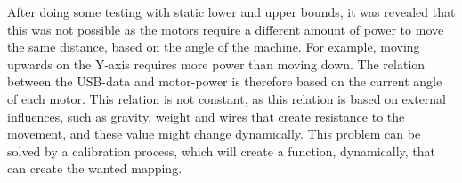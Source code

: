 After doing some testing with static lower and upper bounds, it was revealed that this was not possible as the motors require a different amount of power to move the same distance, based on the angle of the machine.
For example, moving upwards on the Y-axis requires more power than moving down.
The relation between the USB-data and motor-power is therefore based on the current angle of each motor.
This relation is not constant, as this relation is based on external influences, such as gravity, weight and wires that create resistance to the movement, and these value might change dynamically.
This problem can be solved by a calibration process, which will create a function, dynamically, that can create the wanted mapping.
